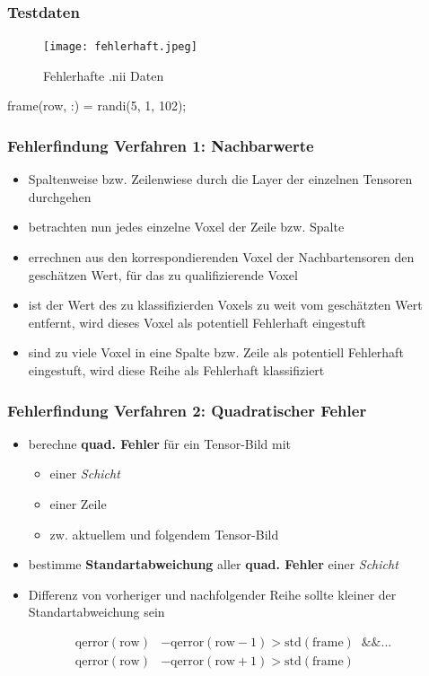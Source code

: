 \documentclass[12pt,a4paper]{beamer}
\begin{document}
\begin{frame}
	\frametitle{Testdaten}
	\begin{figure}
		\centering
		\texttt{[image: fehlerhaft.jpeg]} 
		\caption{Fehlerhafte .nii Daten} %
	\end{figure}
	frame(row, :) = randi(5, 1, 102);	
\end{frame}

\begin{frame}
	\frametitle{Fehlerfindung Verfahren 1: Nachbarwerte}
	\begin{itemize}
		\item Spaltenweise bzw. Zeilenwiese  durch die Layer der einzelnen Tensoren durchgehen
		\item betrachten nun jedes einzelne Voxel der Zeile bzw. Spalte
		\item errechnen aus den  korrespondierenden Voxel der Nachbartensoren  den gesch\"atzen Wert, f\"ur das zu qualifizierende Voxel
		\item ist der Wert des zu klassifizierden Voxels zu weit vom gesch\"atzten Wert entfernt, wird dieses Voxel als potentiell Fehlerhaft eingestuft
		\item sind zu viele Voxel in eine Spalte bzw. Zeile als potentiell Fehlerhaft eingestuft, wird diese Reihe als Fehlerhaft klassifiziert
	\end{itemize}
\end{frame}

\begin{frame}
	\frametitle{Fehlerfindung Verfahren 2: Quadratischer Fehler}

	\begin{itemize}
		\item berechne \textbf{quad. Fehler}  für ein Tensor-Bild mit
		\begin{itemize}
			\item einer \textit{Schicht}
			\item einer Zeile 
			\item zw. aktuellem und folgendem Tensor-Bild
		\end{itemize}
		\item bestimme \textbf{Standartabweichung} aller \textbf{quad. Fehler} einer \textit{Schicht}
		\item Differenz von vorheriger und nachfolgender Reihe sollte kleiner der Standartabweichung sein
	\end{itemize}
	
	\begin{align*}
		\text{qerror}(\text{row}) &- \text{qerror}(\text{row}-1)  > \text{std}(\text{frame}) \;\;\&\& ... \\
		\text{qerror}(\text{row}) &- \text{qerror}(\text{row}+1) > \text{std}(\text{frame})
	\end{align*}
\end{frame}
\end{document}
